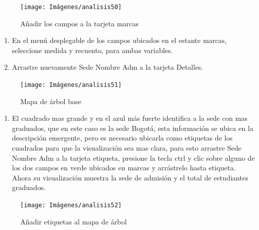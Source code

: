 \documentclass[
]{book}
\providecommand{\tightlist}{%
  \setlength{\itemsep}{0pt}\setlength{\parskip}{0pt}}
\begin{document}
\begin{figure}

{\centering \texttt{[image: Imágenes/analisis50]} 

}

\caption{Añadir los campos a la tarjeta marcas}\label{fig:paso2mapaarbol-fig}
\end{figure}

\begin{enumerate}
\def\labelenumi{\arabic{enumi}.}
\setcounter{enumi}{2}
\item
  En el menú desplegable de los campos ubicados en el estante marcas, seleccione medida y recuento, para ambas variables.
\item
  Arrastre nuevamente Sede Nombre Adm a la tarjeta Detalles.
\end{enumerate}

\begin{figure}

{\centering \texttt{[image: Imágenes/analisis51]} 

}

\caption{Mapa de árbol base}\label{fig:paso4mapaarbol-fig}
\end{figure}

\begin{enumerate}
\def\labelenumi{\arabic{enumi}.}
\setcounter{enumi}{4}
\tightlist
\item
  El cuadrado mas grande y en el azul más fuerte identifica a la sede con mas graduados, que en este caso es la sede Bogotá, esta información se ubica en la descripción emergente, pero es necesario ubicarla como etiquetas de los cuadrados para que la visualización sea mas clara, para esto arrastre Sede Nombre Adm a la tarjeta etiqueta, presione la tecla ctrl y clic sobre alguno de los dos campos en verde ubicados en marcas y arrástrelo hasta etiqueta. Ahora su visualización muestra la sede de admisión y el total de estudiantes graduados.
\end{enumerate}

\begin{figure}

{\centering \texttt{[image: Imágenes/analisis52]} 

}

\caption{Añadir etiquetas al mapa de árbol}\label{fig:paso5mapaarbol-fig}
\end{figure}
\end{document}
